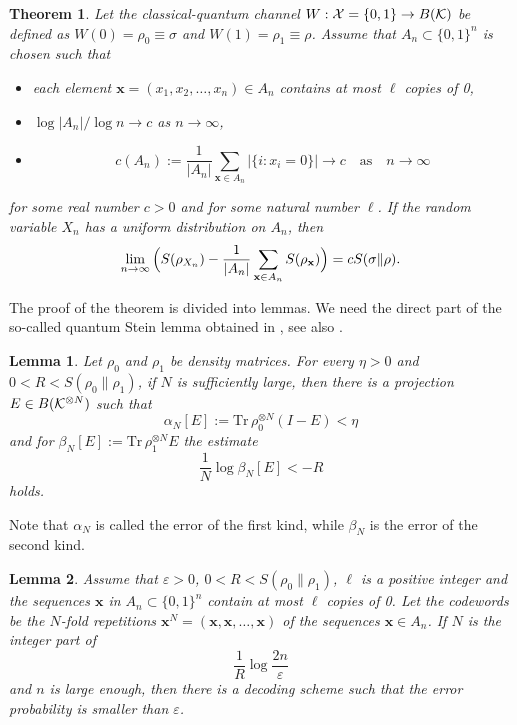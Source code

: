 \documentclass[12pt,a4paper]{article}
\newtheorem{lemma}{Lemma}
\newtheorem{thm}{Theorem}
\def\Tr{{\mathrm{Tr}}}
\def\eps{\varepsilon}
\def\iK{{\cal K}}
\def\iX{{\cal X}}
\def\ot{\otimes}
\def\bfx{\mathbf{x}}
\begin{document}
\begin{thm}\label{T:3}
Let the classical-quantum channel $W:\iX=\{0,1\} \to B(\iK)$ be defined as
$W(0)=\rho_0\equiv \sigma$ and $W(1)=\rho_1\equiv\rho$. Assume that
$A_n \subset \{0,1\}^n$ is chosen such that
\begin{itemize}
\item[(a)]
each element $\bfx=(x_1,x_2,\dots, x_n) \in A_n$ contains at most $\ell$
copies of 0,
\item[(b)]
$\log |A_n|/ \log n \to c$ as $n \to \infty$,
\item[(c)]
$$
c(A_n):= \frac{1}{|A_n|}\sum_{\bfx \in A_n}|\{i: x_i=0\}| \to c
\quad\mbox{as}\quad n \to \infty
$$
\end{itemize}
for some real number $c>0$ and for some natural number $\ell$. If the random variable
$X_n$ has a uniform distribution on $A_n$, then
$$
\lim_{n \to \infty} \Big( S(\rho_{X_n})-\frac{1}{|A_n|} \sum_{{\bf x} \in A_n}
S(\rho_{{\bf x}}) \Big) = cS(\sigma\|\rho).
$$
\end{thm}

The proof of the theorem is divided into lemmas. We need the direct
part of the so-called quantum Stein lemma obtained in \cite{HP},
see also \cite{Bje, Hay, ON, pd}.

\begin{lemma}\label{L:1}
Let $\rho_0$ and $\rho_1$ be density matrices. For every $\eta >0$ and
$0 < R < S(\rho_0\|\rho_1)$, if $N$ is sufficiently large, then there is
a projection $E \in B(\iK^{\ot N})$ such that
$$
\alpha_N[E]:=\Tr\, \rho_0^{\ot N}(I-E) < \eta
$$
and for $\beta_N[E]:=\Tr\, \rho_1^{\ot N}E$ the estimate
$$
\frac{1}{N} \log \beta_N[E] <  - R
$$
holds.
\end{lemma}

Note that $\alpha_N$ is called the error of the first kind, while $\beta_N$ is
the error of the second kind.

\begin{lemma}\label{L:3}
Assume that $\eps >0$, $0<R< S(\rho_0 \|\rho_1)$, $\ell$ is a positive
integer and the sequences $\bfx$ in $A_n \subset \{0,1\}^n$ contain at most $\ell$
copies of 0. Let the codewords be the  $N$-fold repetitions $\bfx^N=(\bfx,\bfx,
\dots,\bfx)$  of the sequences $\bfx \in A_n$. If $N$ is the integer part of
$$
\frac{1}{R} \log \frac{2n}{\eps}
$$
and $n$ is large enough, then there is a decoding scheme such that the error 
probability is smaller than $\eps$.

\end{lemma}
\end{document}
